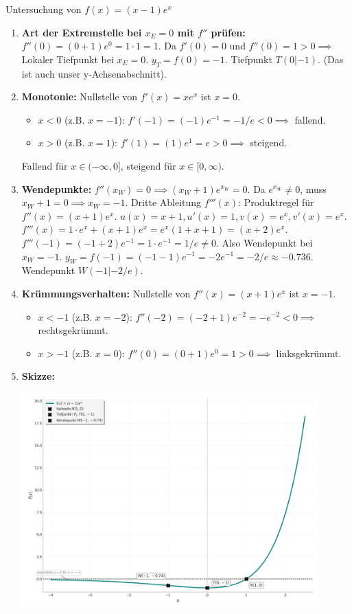 \begin{beispielumgebung}{Untersuchung von $f(x) = (x-1)e^x$}
\begin{enumerate}
    \item \textbf{Art der Extremstelle bei $x_E=0$ mit $f''$ prüfen:}
        $f''(0) = (0+1)e^0 = 1 \cdot 1 = 1$.
        Da $f'(0)=0$ und $f''(0)=1 > 0 \implies$ Lokaler Tiefpunkt bei $x_E=0$.
        $y_T = f(0) = -1$. Tiefpunkt $T(0|-1)$. (Das ist auch unser y-Achsenabschnitt).
    \item \textbf{Monotonie:} Nullstelle von $f'(x)=xe^x$ ist $x=0$.
        \begin{itemize}
            \item $x < 0$ (z.B. $x=-1$): $f'(-1) = (-1)e^{-1} = -1/e < 0 \implies$ fallend.
            \item $x > 0$ (z.B. $x=1$): $f'(1) = (1)e^{1} = e > 0 \implies$ steigend.
        \end{itemize}
        Fallend für $x \in (-\infty, 0]$, steigend für $x \in [0, \infty)$.
    \item \textbf{Wendepunkte:} $f''(x_W)=0 \implies (x_W+1)e^{x_W} = 0$.
        Da $e^{x_W} \neq 0$, muss $x_W+1=0 \implies x_W = -1$.
        Dritte Ableitung $f'''(x)$: Produktregel für $f''(x)=(x+1)e^x$. $u(x)=x+1, u'(x)=1, v(x)=e^x, v'(x)=e^x$.
        $f'''(x) = 1 \cdot e^x + (x+1)e^x = e^x(1+x+1) = (x+2)e^x$.
        $f'''(-1) = (-1+2)e^{-1} = 1 \cdot e^{-1} = 1/e \neq 0$.
        Also Wendepunkt bei $x_W=-1$.
        $y_W = f(-1) = (-1-1)e^{-1} = -2e^{-1} = -2/e \approx -0.736$.
        Wendepunkt $W(-1|-2/e)$.
    \item \textbf{Krümmungsverhalten:} Nullstelle von $f''(x)=(x+1)e^x$ ist $x=-1$.
        \begin{itemize}
            \item $x < -1$ (z.B. $x=-2$): $f''(-2) = (-2+1)e^{-2} = -e^{-2} < 0 \implies$ rechtsgekrümmt.
            \item $x > -1$ (z.B. $x=0$): $f''(0) = (0+1)e^{0} = 1 > 0 \implies$ linksgekrümmt.
        \end{itemize}
    \item \textbf{Skizze:}
        \begin{center}
            \includegraphics[width=0.9\textwidth]{grafiken/Kurvendiskussion_eFunktion_Polynom.png}

\end{center}
\end{enumerate}
\end{beispielumgebung}
